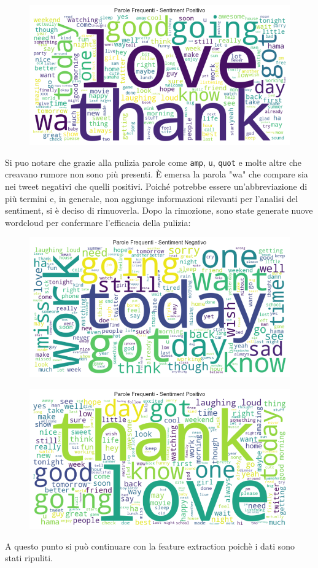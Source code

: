 \documentclass[12pt,a4paper]{report} %
\begin{document}
\begin{figure}[H]
    \centering
    \includegraphics[width=0.75\linewidth]{immagini/wordcloud_positivo_conwa.png}
    \label{fig:enter-label}
\end{figure}
Si puo notare che grazie alla pulizia parole come \texttt{amp}, \texttt{u},  \texttt{quot} e molte altre che creavano rumore non sono più presenti. È  emersa  la parola "wa" che compare sia nei tweet negativi che quelli positivi. Poiché potrebbe essere un’abbreviazione di più termini e, in generale, non aggiunge informazioni rilevanti per l’analisi del sentiment, si è deciso di rimuoverla. Dopo la rimozione, sono state generate nuove wordcloud per confermare l’efficacia della pulizia:
\begin{figure}[H]
    \centering
    \includegraphics[width=0.75\linewidth]{immagini/wordcloud_negativo_nowa.png}
    \label{fig:enter-label}
\end{figure}
\begin{figure}[H]
    \centering
    \includegraphics[width=0.75\linewidth]{immagini/wordcloud_positivo_nowa.png}

    \label{fig:enter-label}
\end{figure}
A questo punto si può continuare con la feature extraction poichè i dati sono stati ripuliti.
\end{document}
